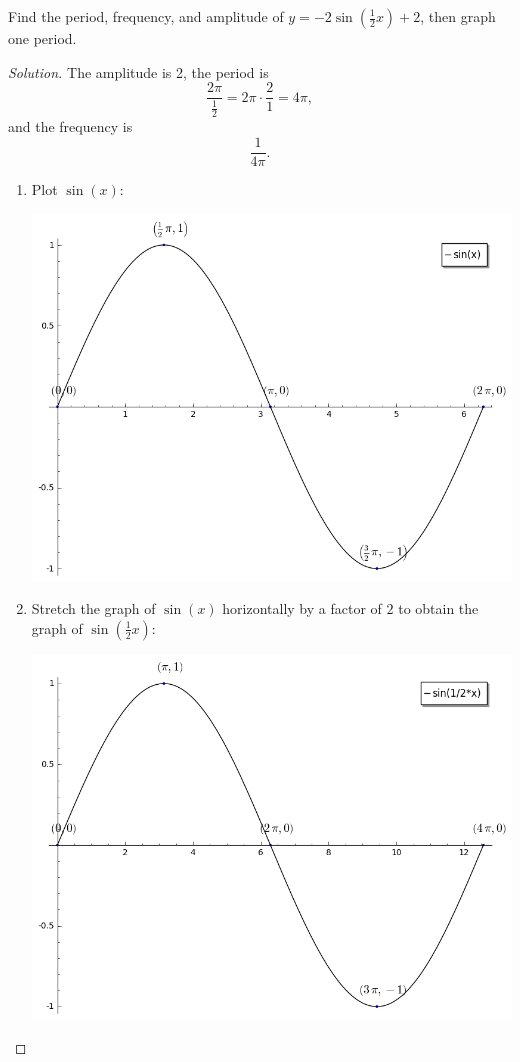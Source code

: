 \documentclass[12pt]{amsart}
\begin{document}
\begin{thm}[20 Points]\label{ex1}
  Find the period, frequency, and amplitude of $y = -2\sin\left(\frac{1}{2}x\right) + 2$, then graph one period.
  \begin{proof}[Solution]
    The amplitude is 2, the period is 
    $$\frac{2\pi}{\frac{1}{2}} = 2\pi \cdot \frac{2}{1} = 4\pi,$$
    and the frequency is 
    $$\frac{1}{4\pi}.$$
    \begin{enumerate}
    \item
      Plot $\sin(x)$:
      \begin{center}
        \includegraphics[scale=0.5]{sin/sine}
      \end{center}
    \item
      Stretch the graph of $\sin(x)$ horizontally by a factor of $2$ to obtain the graph of $\sin\left(\frac{1}{2}x\right)$:
      \begin{center}
        \includegraphics[scale=0.5]{sin/p_1}

\end{center}
\end{enumerate}
\end{proof}
\end{thm}
\end{document}
